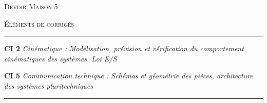 \documentclass[11pt,oneside]{article}
\begin{document}
\pagestyle{fancy}
\renewcommand{\headrulewidth}{0pt}

\fancyhead{}

\fancyhead[C]{\rule{12cm}{.5pt}}


\renewcommand{\footrulewidth}{0.2pt}

\fancyfoot[C]{\footnotesize{\bfseries \thepage}}
\ifthenelse{\boolean{prof}}{%
\fancyfoot[R]{\footnotesize{DM 3} -- CI 2 : Cinématique \& CI 5 : Communication technique}
}{%
\fancyfoot[R]{\footnotesize{DM 3}}%
}



\begin{center}
 \Large\textsc{Devoir Maison 5}
\end{center}

\begin{center}
 \large\textsc{Éléments de corrigés} 
\end{center}


\vspace{0.5cm}


\noindent\rule{\linewidth}{.2pt}
\begin{center}
 \large\textbf{CI 2} \textit{Cinématique : Modélisation, prévision et vérification du comportement cinématiques des systèmes. Loi E/S}

 \large\textbf{CI 5} \textit{Communication technique : Schémas et géométrie des pièces, architecture des systèmes pluritechniques}
\end{center}
\noindent\rule{\linewidth}{.2pt}
\end{document}
